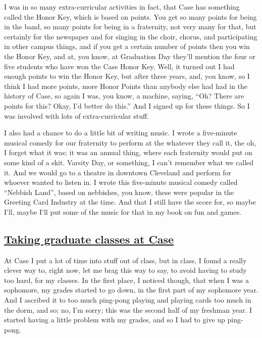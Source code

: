 \documentclass[]{article}
\begin{document}
I was in so many extra-curricular activities in fact, that Case has
something called the Honor Key, which is based on points. You get so
many points for being in the band, so many points for being in a
fraternity, not very many for that, but certainly for the newspaper and
for singing in the choir, chorus, and participating in other campus
things, and if you get a certain number of points then you win the Honor
Key, and at, you know, at Graduation Day they'll mention the four or
five students who have won the Case Honor Key. Well, it turned out I had
enough points to win the Honor Key, but after three years, and, you
know, so I think I had more points, more Honor Points than anybody else
had had in the history of Case, so again I was, you know, a machine,
saying, ``Oh? There are points for this? Okay, I'd better do this.'' And
I signed up for these things. So I was involved with lots of
extra-curricular stuff.

I also had a chance to do a little bit of writing music. I wrote a
five-minute musical comedy for our fraternity to perform at the whatever
they call it, the oh, I forget what it was; it was an annual thing,
where each fraternity would put on some kind of a skit. Varsity Day, or
something, I can't remember what we called it. And we would go to a
theatre in downtown Cleveland and perform for whoever wanted to listen
in. I wrote this five-minute musical comedy called ``Nebbish Land'',
based on nebbishes, you know, these were popular in the Greeting Card
Industry at the time. And that I still have the score for, so maybe
I'll, maybe I'll put some of the music for that in my book on fun and
games.

\subsection{\texorpdfstring{\href{http://webofstories.com/play/17075}{Taking
graduate classes at
Case}}{Taking graduate classes at Case}}\label{taking-graduate-classes-at-case}

At Case I put a lot of time into stuff out of class, but in class, I
found a really clever way to, right now, let me brag this way to say, to
avoid having to study too hard, for my classes. In the first place, I
noticed though, that when I was a sophomore, my grades started to go
down, in the first part of my sophomore year. And I ascribed it to too
much ping-pong playing and playing cards too much in the dorm, and so;
no, I'm sorry; this was the second half of my freshman year. I started
having a little problem with my grades, and so I had to give up
ping-pong.
\end{document}
